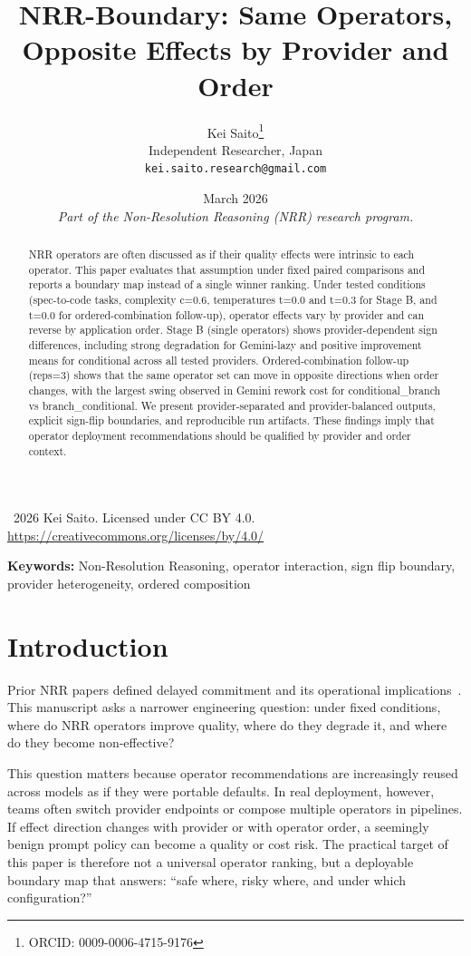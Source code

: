 \documentclass[11pt,a4paper]{article}
\title{\textbf{NRR-Boundary: Same Operators, Opposite Effects by Provider and Order}}
\author{
  Kei Saito\thanks{ORCID: 0009-0006-4715-9176} \\
  Independent Researcher, Japan \\
  \texttt{kei.saito.research@gmail.com}
}
\date{March 2026 \\[0.5em]
\textit{Part of the Non-Resolution Reasoning (NRR) research program.}}
\begin{document}
\maketitle

\begin{center}
\textcopyright\ 2026 Kei Saito.
Licensed under CC BY 4.0.\\
\url{https://creativecommons.org/licenses/by/4.0/}
\end{center}

\begin{abstract}
NRR operators are often discussed as if their quality effects were intrinsic to each operator. This paper evaluates that assumption under fixed paired comparisons and reports a boundary map instead of a single winner ranking. Under tested conditions (spec-to-code tasks, complexity c=0.6, temperatures t=0.0 and t=0.3 for Stage B, and t=0.0 for ordered-combination follow-up), operator effects vary by provider and can reverse by application order. Stage B (single operators) shows provider-dependent sign differences, including strong degradation for Gemini-lazy and positive improvement means for conditional across all tested providers. Ordered-combination follow-up (reps=3) shows that the same operator set can move in opposite directions when order changes, with the largest swing observed in Gemini rework cost for conditional\_branch vs branch\_conditional. We present provider-separated and provider-balanced outputs, explicit sign-flip boundaries, and reproducible run artifacts. These findings imply that operator deployment recommendations should be qualified by provider and order context.
\end{abstract}

\noindent\textbf{Keywords:} Non-Resolution Reasoning, operator interaction, sign flip boundary, provider heterogeneity, ordered composition

\section{Introduction}
\label{sec:intro}

Prior NRR papers defined delayed commitment and its operational implications~\cite{saito2025nrr,saito2026phi,saito2026ime}. This manuscript asks a narrower engineering question: under fixed conditions, where do NRR operators improve quality, where do they degrade it, and where do they become non-effective?

This question matters because operator recommendations are increasingly reused across models as if they were portable defaults. In real deployment, however, teams often switch provider endpoints or compose multiple operators in pipelines. If effect direction changes with provider or with operator order, a seemingly benign prompt policy can become a quality or cost risk. The practical target of this paper is therefore not a universal operator ranking, but a deployable boundary map that answers: ``safe where, risky where, and under which configuration?''
\end{document}

